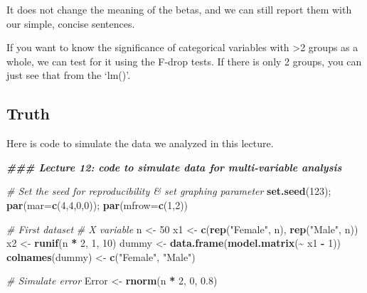 \documentclass[
]{article}
\newenvironment{Shaded}{\begin{snugshade}}{\end{snugshade}}
\newcommand{\AttributeTok}[1]{\textcolor[rgb]{0.13,0.29,0.53}{#1}}
\newcommand{\CommentTok}[1]{\textcolor[rgb]{0.56,0.35,0.01}{\textit{#1}}}
\newcommand{\DecValTok}[1]{\textcolor[rgb]{0.00,0.00,0.81}{#1}}
\newcommand{\DocumentationTok}[1]{\textcolor[rgb]{0.56,0.35,0.01}{\textbf{\textit{#1}}}}
\newcommand{\FloatTok}[1]{\textcolor[rgb]{0.00,0.00,0.81}{#1}}
\newcommand{\FunctionTok}[1]{\textcolor[rgb]{0.13,0.29,0.53}{\textbf{#1}}}
\newcommand{\NormalTok}[1]{#1}
\newcommand{\OtherTok}[1]{\textcolor[rgb]{0.56,0.35,0.01}{#1}}
\newcommand{\SpecialCharTok}[1]{\textcolor[rgb]{0.81,0.36,0.00}{\textbf{#1}}}
\newcommand{\StringTok}[1]{\textcolor[rgb]{0.31,0.60,0.02}{#1}}
\begin{document}
It does not change the meaning of the betas, and we can still report
them with our simple, concise sentences.

If you want to know the significance of categorical variables with
\textgreater2 groups as a whole, we can test for it using the F-drop
tests. If there is only 2 groups, you can just see that from the `lm()'.

\subsection{Truth}\label{truth}

Here is code to simulate the data we analyzed in this lecture.

\begin{Shaded}
\begin{Highlighting}[]
\DocumentationTok{\#\#\# Lecture 12: code to simulate data for multi{-}variable analysis}

\CommentTok{\# Set the seed for reproducibility \& set graphing parameter}
\FunctionTok{set.seed}\NormalTok{(}\DecValTok{123}\NormalTok{); }\FunctionTok{par}\NormalTok{(}\AttributeTok{mar=}\FunctionTok{c}\NormalTok{(}\DecValTok{4}\NormalTok{,}\DecValTok{4}\NormalTok{,}\DecValTok{0}\NormalTok{,}\DecValTok{0}\NormalTok{)); }\FunctionTok{par}\NormalTok{(}\AttributeTok{mfrow=}\FunctionTok{c}\NormalTok{(}\DecValTok{1}\NormalTok{,}\DecValTok{2}\NormalTok{))}

\CommentTok{\# First dataset}
\CommentTok{\# X variable}
\NormalTok{n }\OtherTok{\textless{}{-}} \DecValTok{50}
\NormalTok{x1 }\OtherTok{\textless{}{-}} \FunctionTok{c}\NormalTok{(}\FunctionTok{rep}\NormalTok{(}\StringTok{"Female"}\NormalTok{, n), }\FunctionTok{rep}\NormalTok{(}\StringTok{"Male"}\NormalTok{, n))}
\NormalTok{x2 }\OtherTok{\textless{}{-}} \FunctionTok{runif}\NormalTok{(n }\SpecialCharTok{*} \DecValTok{2}\NormalTok{, }\DecValTok{1}\NormalTok{, }\DecValTok{10}\NormalTok{)}
\NormalTok{dummy }\OtherTok{\textless{}{-}} \FunctionTok{data.frame}\NormalTok{(}\FunctionTok{model.matrix}\NormalTok{(}\SpecialCharTok{\textasciitilde{}}\NormalTok{ x1 }\SpecialCharTok{{-}} \DecValTok{1}\NormalTok{))}
\FunctionTok{colnames}\NormalTok{(dummy) }\OtherTok{\textless{}{-}} \FunctionTok{c}\NormalTok{(}\StringTok{"Female"}\NormalTok{, }\StringTok{"Male"}\NormalTok{)}

\CommentTok{\# Simulate error}
\NormalTok{Error }\OtherTok{\textless{}{-}} \FunctionTok{rnorm}\NormalTok{(n }\SpecialCharTok{*} \DecValTok{2}\NormalTok{, }\DecValTok{0}\NormalTok{, }\FloatTok{0.8}\NormalTok{)}


\end{Highlighting}
\end{Shaded}
\end{document}
